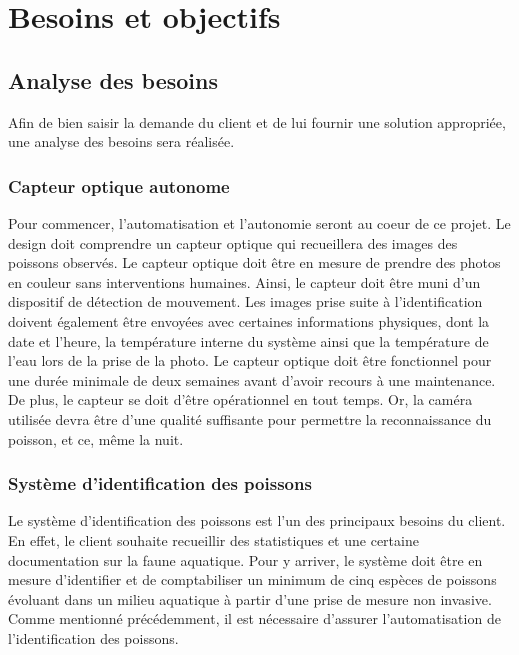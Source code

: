 
%
%

\chapter{Besoins et objectifs}
\label{s:objectifs}

\section{Analyse des besoins}

Afin de bien saisir la demande du client et de lui fournir une solution appropriée, une analyse des besoins sera réalisée. 

\subsection{Capteur optique autonome}

Pour commencer, l'automatisation et l'autonomie seront au coeur de ce projet. Le design doit comprendre un capteur optique qui recueillera des images des poissons observés. Le capteur optique doit être en mesure de prendre des photos en couleur sans interventions humaines. Ainsi, le capteur doit être muni d'un dispositif de détection de mouvement. Les images prise suite à l'identification doivent également être envoyées avec certaines informations physiques, dont la date et l'heure, la température interne du système ainsi que la température de l'eau lors de la prise de la photo. Le capteur optique doit être fonctionnel pour une durée minimale de deux semaines avant d'avoir recours à une maintenance. De plus, le capteur se doit d'être opérationnel en tout temps. Or, la caméra utilisée devra être d'une qualité suffisante pour permettre la reconnaissance du poisson, et ce, même la nuit.

\subsection{Système d'identification des poissons}

Le système d'identification des poissons est l'un des principaux besoins du client. En effet, le client souhaite recueillir des statistiques et une certaine documentation sur la faune aquatique. Pour y arriver, le système doit être en mesure d'identifier et de comptabiliser un minimum de cinq espèces de poissons évoluant dans un milieu aquatique à partir d'une prise de mesure non invasive. Comme mentionné précédemment, il est nécessaire d'assurer l'automatisation de l'identification des poissons.

